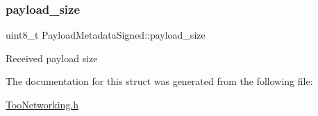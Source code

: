 \subsubsection{\texorpdfstring{payload\+\_\+size}{payload\_size}}
{\footnotesize\ttfamily uint8\+\_\+t Payload\+Metadata\+Signed\+::payload\+\_\+size}

Received payload size 

The documentation for this struct was generated from the following file\+:\begin{DoxyCompactItemize}
\item 
\hyperlink{TooNetworking_8h}{Too\+Networking.\+h}\end{DoxyCompactItemize}

